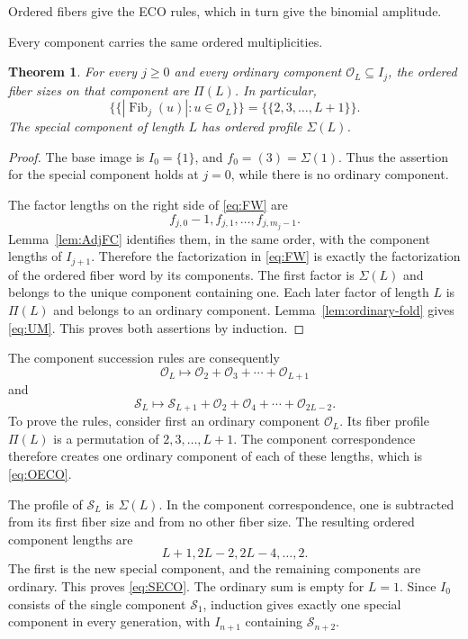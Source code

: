 \documentclass[11pt]{article}
\newtheorem{theorem}{Theorem}[section]
\theoremstyle{definition}
\theoremstyle{remark}
\newcommand{\multiset}[1]{\{\!\{#1\}\!\}}
\begin{document}
Ordered fibers give the ECO rules, which in turn give the binomial amplitude.

Every component carries the same ordered multiplicities.
\begin{theorem}

For every \(j\geq0\) and every ordinary component
\(\mathcal O_L\subseteq I_j\), the ordered fiber sizes on that component are
\(\Pi(L)\).  In particular,
\begin{equation}
\label{eq:UM}
 \multiset{|\operatorname{Fib}_j(u)|:u\in\mathcal O_L}
 =\multiset{2,3,\ldots,L+1}.
\end{equation}
The special component of length \(L\) has ordered profile \(\Sigma(L)\).
\end{theorem}

\begin{proof}
The base image is \(I_0=\{1\}\), and
\(f_0=(3)=\Sigma(1)\).  Thus the assertion for the special component holds
at \(j=0\), while there is no ordinary component.

The factor lengths on the right side of \eqref{eq:FW} are
\[
 f_{j,0}-1,f_{j,1},\ldots,f_{j,m_j-1}.
\]
Lemma~\ref{lem:AdjFC} identifies them, in the same order, with the component
lengths of \(I_{j+1}\).  Therefore the factorization in
\eqref{eq:FW} is exactly the factorization of the ordered fiber word by its
components.  The first factor is \(\Sigma(L)\) and belongs to the unique
component containing one.  Each later factor of length \(L\) is \(\Pi(L)\)
and belongs to an ordinary component.  Lemma~\ref{lem:ordinary-fold} gives
\eqref{eq:UM}.  This proves both assertions by induction.
\end{proof}

The component succession rules are consequently
\begin{equation}
\label{eq:OECO}
 \mathcal O_L\longmapsto
 \mathcal O_2+\mathcal O_3+\cdots+\mathcal O_{L+1}
\end{equation}
and
\begin{equation}
\label{eq:SECO}
 \mathcal S_L\longmapsto
 \mathcal S_{L+1}+\mathcal O_2+\mathcal O_4+\cdots+\mathcal O_{2L-2}.
\end{equation}
To prove the rules, consider first an ordinary component \(\mathcal O_L\).
Its fiber profile \(\Pi(L)\) is a permutation of
\(2,3,\ldots,L+1\).  The component correspondence therefore creates one
ordinary component of each of these lengths, which is \eqref{eq:OECO}.

The profile of \(\mathcal S_L\) is \(\Sigma(L)\).  In the component
correspondence, one is subtracted from its first fiber size and from no other
fiber size.  The resulting ordered component lengths are
\[
 L+1,2L-2,2L-4,\ldots,2.
\]
The first is the new special component, and the remaining components are
ordinary.  This proves \eqref{eq:SECO}.  The ordinary sum is empty for
\(L=1\).  Since \(I_0\) consists of the single component \(\mathcal S_1\),
induction gives exactly one special component in every generation, with
\(I_{n+1}\) containing \(\mathcal S_{n+2}\).
\end{document}
